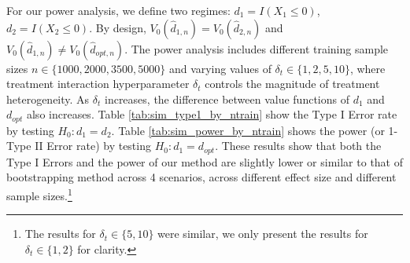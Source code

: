\documentclass{article}
\begin{document}
\begin{center}
\begin{table}[t]%
\caption{Estimated difference in value functions Mean (SD) and t-test rejection rate (RR) under four scenarios for simulation data based on 1000 replications ($\delta_t = 1$, $n=5000$).\label{tab:sim_test_diff}}
\centering
{}
\end{table}
\end{center}


For our power analysis, we define two regimes: $d_1 = I(X_1 \leq 0)$, $d_2 = I(X_2 \leq 0)$. By design, $V_0(\hat{d}_{1,n}) = V_0(\hat{d}_{2,n})$ and $V_0(\hat{d}_{1,n}) \neq V_0(\hat{d}_{opt,n})$. The power analysis includes different training sample sizes $n \in\{ 1000, 2000, 3500,5000\}$ and varying values of $\delta_t \in \{1,2,5,10\}$, where treatment interaction hyperparameter $\delta_t$ controls the magnitude of treatment heterogeneity. As $\delta_t$ increases, the difference between value functions of $d_1$ and $d_{opt}$ also increases. 
Table \ref{tab:sim_type1_by_ntrain} show the Type I Error rate by testing $H_0: d_1 = d_2$. Table \ref{tab:sim_power_by_ntrain} shows the power (or 1-Type II Error rate) by testing $H_0: d_1 = d_{opt}$. These results show that both the Type I Errors and the power of our method are slightly lower or similar to that of bootstrapping method across 4 scenarios, across different effect size and different sample sizes.\footnote{The results for $\delta_t\in\{5,10\}$ were similar, we only present the results for $\delta_t\in\{1,2\}$ for clarity.}
\end{document}
